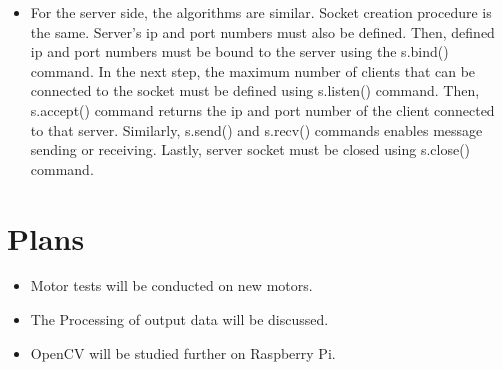 \documentclass[a4paper,12pt]{article}
\begin{document}
\begin{itemize}
\begin{itemize}
		\item For the server side, the algorithms are similar. Socket creation procedure is the same. Server's ip and port numbers must also be defined. Then, defined ip and port numbers must be bound to the server using the s.bind() command. In the next step, the maximum number of clients that can be connected to the socket must be defined using s.listen() command. Then, s.accept() command returns the ip and port number of the client connected to that server. Similarly, s.send() and s.recv() commands enables message sending or receiving. Lastly, server socket must be closed using s.close() command.
	\end{itemize}	
\end{itemize}

\section{Plans}

	\begin{itemize}
		\item Motor tests will be conducted on new motors.
		\item The Processing of output data will be discussed.
		\item OpenCV will be studied further on Raspberry Pi.
		
		
	\end{itemize}




%



	




\end{document}

